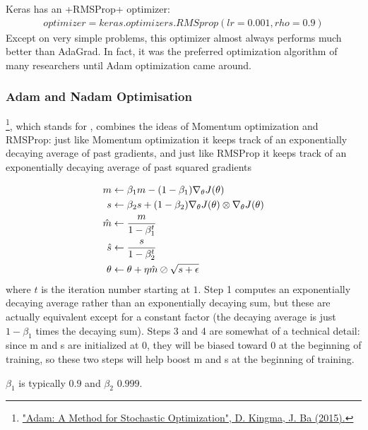 Keras has an \cd+RMSProp+ optimizer:
\begin{equation}
\begin{aligned}
optimizer = keras.optimizers.RMSprop(lr=0.001, rho=0.9)
\end{aligned}
\end{equation}
Except on very simple problems, this optimizer almost always performs much better than AdaGrad. In fact, it was the preferred optimization algorithm of many researchers until Adam optimization came around.

\subsubsection{Adam and Nadam Optimisation}
\label{subsec:ADAM}
\footnote{\href{https://homl.info/59}{"Adam: A Method for Stochastic Optimization", D. Kingma, J. Ba (2015).}}, which stands for , combines the ideas of Momentum optimization and RMSProp: just like Momentum optimization it keeps track of an exponentially decaying average of past gradients, and just like RMSProp it keeps track of an exponentially decaying average of past squared gradients 

\begin{equation}
\begin{aligned}
m &\leftarrow \beta_1 m - \br{1-\beta_1} \nabla_\theta J(\theta)\\
s &\leftarrow \beta_2 s + (1-\beta_2) \nabla_\theta J(\theta) \otimes \nabla_\theta J(\theta)\\
\hat{m} &\leftarrow\frac{m}{1-\beta_1^t}\\
\hat{s} &\leftarrow\frac{s}{1-\beta_2^t}\\
\theta &\leftarrow \theta + \eta \hat{m} \oslash \sqrt{s+\epsilon}
\end{aligned}
\label{eq:Adam}
\end{equation}
where $t$ is the iteration number starting at $1$. Step 1 computes an exponentially decaying average rather than an exponentially decaying sum, but these are actually equivalent except for a constant factor (the decaying average is just $1 - \beta_1$ times the decaying sum). Steps 3 and 4 are somewhat of a technical detail: since m and s are initialized at 0, they will be biased toward 0 at the beginning of training, so these two steps will help boost m and s at the beginning of training.

$\beta_1$ is typically $0.9$ and $\beta_2$ $0.999$.

